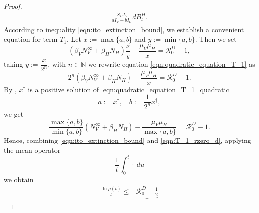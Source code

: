 \begin{proof}
\begin{equation}
\begin{aligned}
            \frac{S_H I_V}{a I_V + b I_H}
            d B_t ^ H.
        \end{aligned}
    \end{equation}
    According to inequality \eqref{eqn:ito_extinction_bound}, we establish
    a convenient equation for term $T_1$. 
    Let $x:= \max \{ a, b\}$ and $y := \min \{a,b\}$. Then we set
    \begin{equation}
        \label{eqn:quadratic_equation_T_1}
        \left (
            \beta_V
             N_V ^ \infty
            +
            \beta_H N_H
        \right )\frac{x}{y}
        -
        \frac{\mu_V \mu_H}{x} 
        = \mathcal{R}_0^D - 1,
    \end{equation}
    taking $y := \dfrac{x}{2^n}$, with $n \in \mathbb{N}$ 
     we rewrite equation
    \eqref{eqn:quadratic_equation_T_1} as
    \begin{equation}
        \label{eqn:quadratic_equation_T_1_quadratic}
        2 ^ n
        \left (
            \beta_V
             N_V ^ \infty
            +
            \beta_H N_H
        \right )
        -
        \frac{\mu_V \mu_H}{x}
        = \mathcal{R}_0^D - 1 . 
    \end{equation}
    By , 
    $x^\dagger$ is a positive solution
    of \eqref{eqn:quadratic_equation_T_1_quadratic}
    $$
        a:= x^\dagger, \quad b:= \frac{1}{2^n} x^{\dagger},
    $$
     we get 
    \begin{equation}\label{eqn:T_1_rzero_d}
         \dfrac{
             \max\{a, b\}
         }{
             \min\{a, b\}
         }
         \left (
              N_V ^ \infty
             +
             \beta_H N_H
         \right )
         -
         \frac{
             \mu_V \mu_H 
         }{
             \max \{a, b\} 
         }
         = \mathcal{R}_0 ^ D - 1 .
    \end{equation}
    Hence, combining \eqref{eqn:ito_extinction_bound} and 
    \eqref{eqn:T_1_rzero_d},
    applying the mean operator
    $$
        \frac{1}{t} 
            \int_{0}^{t}
                \cdot \ 
            du
    $$
     we obtain
%
    \begin{equation} 
    \label{eqn:rzero_d_bound}
        \begin{aligned}
            \frac{
                \ln \rho(t)
            }{t}
            \leq &
                \underbrace{
                    \mathcal{R}_0 ^ D
                    -
                    \frac{1}{2}
}
\end{aligned}
\end{equation}
\end{proof}
